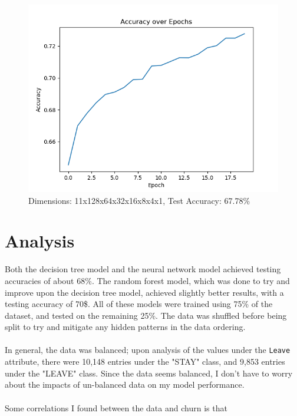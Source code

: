 \documentclass[12pt, notitlepage]{article}
\begin{document}
\begin{figure}[H]
	\centering
	\includegraphics[scale=0.6]{neuralnet3.png}
	\caption{Dimensions: 11x128x64x32x16x8x4x1, Test Accuracy: 67.78\%}
\end{figure}

\section{Analysis}
Both the decision tree model and the neural network model achieved testing accuracies of about 68\%. The random forest model, which was done to try and improve upon the decision tree model, achieved slightly better results, with a testing accuracy of 70\$. All of these models were trained using 75\% of the dataset, and tested on the remaining 25\%. The data was shuffled before being split to try and mitigate any hidden patterns in the data ordering. \\\\
In general, the data was balanced; upon analysis of the values under the \texttt{Leave} attribute, there were 10,148 entries under the "STAY" class, and 9,853 entries under the "LEAVE" class. Since the data seems balanced, I don't have to worry about the impacts of un-balanced data on my model performance.\\\\
Some correlations I found between the data and churn is that 
\end{document}

